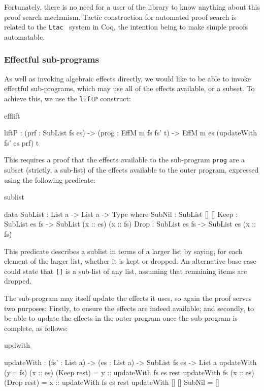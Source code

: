 \noindent
Fortunately, there is no need for a user of the library to know anything about
this proof search mechanism. Tactic construction for automated proof search is
related to the \texttt{Ltac}~\cite{Delahaye2000} system in Coq, the intention
being to make simple proofs automatable.

\subsubsection{Effectful sub-programs}

As well as invoking algebraic effects directly, we would like to be able to
invoke effectful sub-programs, which may use all of the effects available, or
a subset. To achieve this, we use the \texttt{liftP} construct:

\begin{SaveVerbatim}{efflift}

liftP : (prf : SubList fs es) ->
        (prog : EffM m fs fs' t) -> 
        EffM m es (updateWith fs' es prf) t

\end{SaveVerbatim}

\noindent
This requires a proof that the effects available to the sub-program \texttt{prog}
are a subset (strictly, a sub-list) of the effects available to the outer program,
expressed using the following predicate:

\begin{SaveVerbatim}{sublist}

data SubList : List a -> List a -> Type where
     SubNil : SubList [] []
     Keep   : SubList es fs -> 
              SubList (x :: es) (x :: fs)
     Drop   : SubList es fs -> 
              SubList es (x :: fs)

\end{SaveVerbatim}

\noindent
This predicate describes a sublist in terms of a larger list by saying, for each
element of the larger list, whether it is kept or dropped. An alternative
base case could state that \texttt{[]} is a sub-list of any list, assuming
that remaining items are dropped.

The sub-program may itself update the effects it uses, so again the proof serves
two purposes: Firstly, to ensure the effects are indeed available; and secondly,
to be able to update the effects in the outer program once the sub-program is
complete, as follows:

\begin{SaveVerbatim}{updwith}

updateWith : (fs' : List a) -> (es : List a) ->
             SubList fs es -> List a
updateWith (y :: fs) (x :: es) (Keep rest) 
           = y :: updateWith fs es rest
updateWith fs        (x :: es) (Drop rest) 
           = x :: updateWith fs es rest
updateWith []        []        SubNil      = []

\end{SaveVerbatim}

